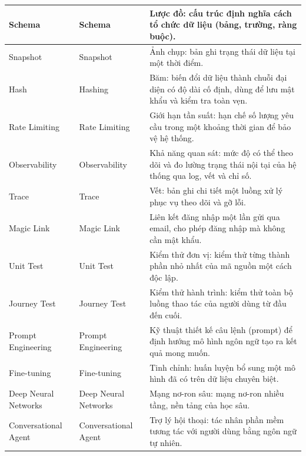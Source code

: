 \begin{longtable}{|L{0.18\textwidth}|L{0.27\textwidth}|L{0.49\textwidth}|}
Schema & Schema & Lược đồ: cấu trúc định nghĩa cách tổ chức dữ liệu (bảng, trường, ràng buộc). \\
\hline

Snapshot & Snapshot & Ảnh chụp: bản ghi trạng thái dữ liệu tại một thời điểm. \\
\hline

Hash & Hashing & Băm: biến đổi dữ liệu thành chuỗi đại diện có độ dài cố định, dùng để lưu mật khẩu và kiểm tra toàn vẹn. \\
\hline

Rate Limiting & Rate Limiting & Giới hạn tần suất: hạn chế số lượng yêu cầu trong một khoảng thời gian để bảo vệ hệ thống. \\
\hline

Observability & Observability & Khả năng quan sát: mức độ có thể theo dõi và đo lường trạng thái nội tại của hệ thống qua log, vết và chỉ số. \\
\hline

Trace & Trace & Vết: bản ghi chi tiết một luồng xử lý phục vụ theo dõi và gỡ lỗi. \\
\hline

Magic Link & Magic Link & Liên kết đăng nhập một lần gửi qua email, cho phép đăng nhập mà không cần mật khẩu. \\
\hline

Unit Test & Unit Test & Kiểm thử đơn vị: kiểm thử từng thành phần nhỏ nhất của mã nguồn một cách độc lập. \\
\hline

Journey Test & Journey Test & Kiểm thử hành trình: kiểm thử toàn bộ luồng thao tác của người dùng từ đầu đến cuối. \\
\hline

Prompt Engineering & Prompt Engineering & Kỹ thuật thiết kế câu lệnh (prompt) để định hướng mô hình ngôn ngữ tạo ra kết quả mong muốn. \\
\hline

Fine-tuning & Fine-tuning & Tinh chỉnh: huấn luyện bổ sung một mô hình đã có trên dữ liệu chuyên biệt. \\
\hline

Deep Neural Networks & Deep Neural Networks & Mạng nơ-ron sâu: mạng nơ-ron nhiều tầng, nền tảng của học sâu. \\
\hline

Conversational Agent & Conversational Agent & Trợ lý hội thoại: tác nhân phần mềm tương tác với người dùng bằng ngôn ngữ tự nhiên. \\
\hline


\end{longtable}
